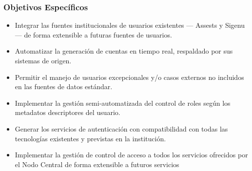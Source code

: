 \subsubsection*{Objetivos Específicos}
\begin{itemize}	
	\item Integrar las fuentes institucionales de usuarios existentes — Assests y Sigenu — de forma extensible a futuras fuentes de usuarios.
	\item Automatizar la generación de cuentas en tiempo real, respaldado por sus sistemas de origen.
	\item Permitir el manejo de usuarios excepcionales y/o casos externos no incluidos en las fuentes de datos estándar.
	\item Implementar la gestión semi-automatizada del control de roles según los metadatos descriptores del usuario.
	\item Generar los servicios de autenticación con compatibilidad con todas las tecnologías existentes y previstas en la institución.
	\item Implementar la gestión de control de acceso a todos los servicios ofrecidos por el Nodo Central de forma extensible a futuros servicios
\end{itemize}